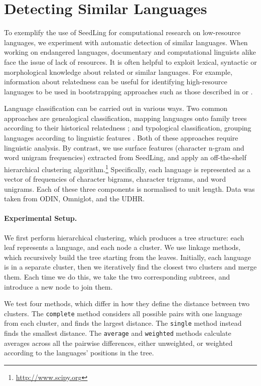 \section{Detecting Similar Languages} \label{sec:cluster}

To exemplify the use of SeedLing for computational research on low-resource languages, we experiment with automatic detection of similar languages. When working on endangered languages, documentary and computational linguists alike face the issue of lack of resources. It is often helpful to exploit lexical, syntactic or morphological knowledge about related or similar languages. For example, information about relatedness can be useful for identifying high-resource languages to be used in bootstrapping approaches such as those described in  or .

Language classification can be carried out in various ways. Two common approaches are genealogical classification, mapping languages onto family trees according to their historical relatedness \cite{swadesh1952,starostin2010}; and typological classification, grouping languages according to linguistic features \cite{georgi2010wals,daume2009}. Both of these approaches require linguistic analysis. By contrast, we use surface features (character n-gram and word unigram frequencies) extracted from SeedLing, and apply an off-the-shelf hierarchical clustering algorithm.\footnote{\url{http://www.scipy.org}} Specifically, each language is represented as a vector of frequencies of character bigrams, character trigrams, and word unigrams. Each of these three components is normalised to unit length.  Data was taken from ODIN, Omniglot, and the UDHR.

\paragraph{Experimental Setup.}
We first perform hierarchical clustering, which produces a tree structure: each leaf represents a language, and each node a cluster. We use linkage methods, which recursively build the tree starting from the leaves. Initially, each language is in a separate cluster, then we iteratively find the closest two clusters and merge them. Each time we do this, we take the two corresponding subtrees, and introduce a new node to join them.

We test four methods, which differ in how they define the distance between two clusters. The \texttt{complete} method considers all possible pairs with one language from each cluster, and finds the largest distance. The \texttt{single} method instead finds the smallest distance. The \texttt{average} and \texttt{weighted} methods calculate averages across all the pairwise differences, either unweighted, or weighted according to the languages' positions in the tree.

